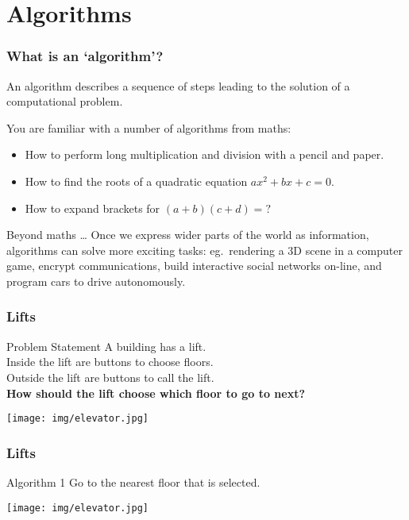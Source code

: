 \documentclass{beamer} %
\begin{document}
\section{Algorithms}

\begin{frame}
\frametitle{What is an `algorithm'?} 

An algorithm describes a sequence of steps leading to the solution of a computational problem.

\vspace{5mm}
You are familiar with a number of algorithms from maths:
\begin{itemize}
\item How to perform long multiplication and division with a pencil and paper.
\item How to find the roots of a quadratic equation $ax^2+bx+c = 0$.
\item How to expand brackets for $(a+b)(c+d) = ?$
\end{itemize}

\begin{block}{Beyond maths \ldots}
Once we express wider parts of the world as information, algorithms can solve more exciting tasks: eg.\ rendering a 3D scene in a computer game, encrypt communications, build interactive social networks on-line, and program cars to drive autonomously.
\end{block}

\end{frame}

\begin{frame}
  \frametitle{Lifts}

  \begin{block}{Problem Statement}
    A building has a lift.\\
    Inside the lift are buttons to choose floors.\\
    Outside the lift are buttons to call the lift.\\
    {\bf How should the lift choose which floor to go to next?}
  \end{block}
  \centering
  \texttt{[image: img/elevator.jpg]}
\end{frame}

\begin{frame}
  \frametitle{Lifts}
  \begin{block}{Algorithm 1}
    Go to the nearest floor that is selected.
  \end{block}
  \centering
  \texttt{[image: img/elevator.jpg]}
\end{frame}
\end{document}
